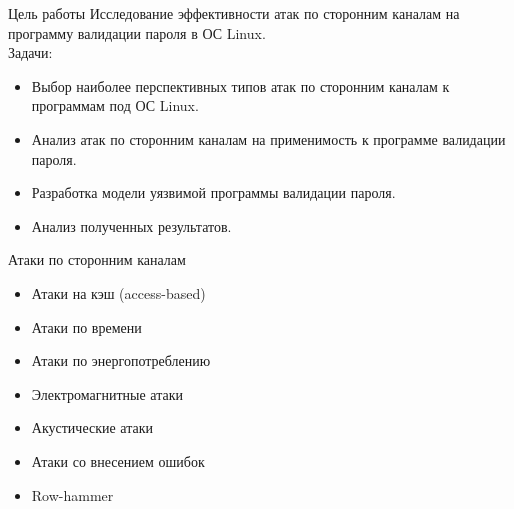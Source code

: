 \documentclass[14pt]{beamer}
\title[Атаки по сторонним каналам]{}
\author[]{Олейников Иван}
\institute[]{Университет ИТМО}
\date[]{Санкт-Петербург, 2017}
\begin{document}
\begin{darkbars}
    \begin{frame}
        \titlepage
    \end{frame}
\end{darkbars}

\begin{frame}{Цель работы}
    Исследование эффективности атак по сторонним каналам на программу валидации
    пароля в ОС Linux. \\[3mm]
    Задачи:
    \begin{itemize}
        \item Выбор наиболее перспективных типов атак по сторонним каналам к
              программам под ОС Linux.
        \item Анализ атак по сторонним каналам на применимость к программе валидации
              пароля.
        \item Разработка модели уязвимой программы валидации пароля.
        \item Анализ полученных результатов.
    \end{itemize}
\end{frame}

\begin{frame}[nologo]{Атаки по сторонним каналам}
    \begin{itemize}
        \item Атаки на кэш (access-based)
        \item Атаки по времени
        \item Атаки по энергопотреблению
        \item Электромагнитные атаки
        \item Акустические атаки
        \item Атаки со внесением ошибок
        \item Row-hammer
    \end{itemize}
\end{frame}
\end{document}
